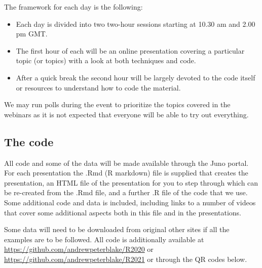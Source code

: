 \documentclass[
  letterpaper,
]{book}
\providecommand{\tightlist}{%
  \setlength{\itemsep}{0pt}\setlength{\parskip}{0pt}}\usepackage{longtable,booktabs,array}
\begin{document}
The framework for each day is the following:

\begin{itemize}
\tightlist
\item
  Each day is divided into two two-hour sessions starting at 10.30 am
  and 2.00 pm GMT.
\item
  The first hour of each will be an online presentation covering a
  particular topic (or topics) with a look at both techniques and code.
\item
  After a quick break the second hour will be largely devoted to the
  code itself or resources to understand how to code the material.
\end{itemize}

We may run polls during the event to prioritize the topics covered in
the webinars as it is not expected that everyone will be able to try out
everything.

\hypertarget{the-code}{%
\subsection{The code}\label{the-code}}

All code and some of the data will be made available through the Juno
portal. For each presentation the .Rmd (R markdown) file is supplied
that creates the presentation, an HTML file of the presentation for you
to step through which can be re-created from the .Rmd file, and a
further .R file of the code that we use. Some additional code and data
is included, including links to a number of videos that cover some
additional aspects both in this file and in the presentations.

Some data will need to be downloaded from original other sites if all
the examples are to be followed. All code is additionally available at
\url{https://github.com/andrewpeterblake/R2020} or
\url{https://github.com/andrewpeterblake/R2021} or through the QR codes
below.
\end{document}
